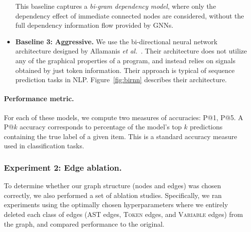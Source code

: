 \begin{itemize}[noitemsep,topsep=0pt]
  This baseline captures a \textit{bi-gram dependency model}, where only the dependency effect of immediate connected nodes are considered, without the full dependency information flow provided by GNNs.
\item \textbf{Baseline 3: Aggressive.}
  We use the bi-directional neural network architecture designed by Allamanis \textit{et al.}~\cite{hellendoorn2018deep}.
  Their architecture does not utilize any of the graphical properties of a program, and instead relies on signals obtained by just token information.
  Their approach is typical of sequence prediction tasks in NLP.
  Figure~\ref{fig:birnn} describes their architecture.
\end{itemize}

\paragraph{Performance metric.}
For each of these models, we compute two measures of accuracies: \textsc{P@1}, \textsc{P@5}.
A \textsc{P@}$k$ accuracy corresponds to percentage of the model's top $k$ predictions containing the true label of a given item.
This is a standard accuracy measure used in classification tasks.

\subsubsection{Experiment 2: Edge ablation.}
To determine whether our graph structure (nodes and edges) was chosen correctly, we also performed a set of ablation studies.
Specifically, we ran experiments using the optimally chosen hyperparameters where we entirely deleted each class of edges (AST edges, \textsc{Token} edges, and \textsc{Variable} edges) from the graph, and compared performance to the original.

